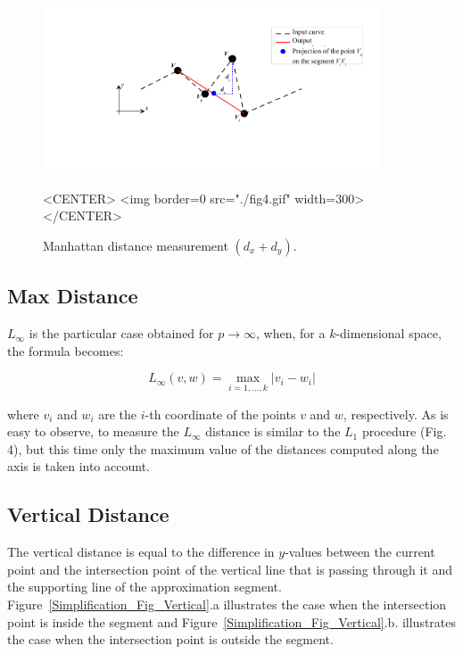 \begin{figure}[h]
\begin{ccTexOnly}
\begin{center}
\includegraphics[width=10cm]{Polygonal_approximation_d/fig4} 
\end{center}
\end{ccTexOnly}
\caption{Manhattan distance measurement $(d_x+d_y)$.
\label{Simplification_Fig_Manhattan}}
\begin{ccHtmlOnly}
<CENTER>
<img border=0 src="./fig4.gif" width=300>
</CENTER>
\end{ccHtmlOnly}
\end{figure}





\subsection{Max Distance}

$L_\infty$ is the particular case obtained for $ p \rightarrow \infty$, when, for a $k$-dimensional space, the formula becomes:

$$ L_\infty (v, w) = \max_{i=1,\ldots,k}{ | v_i - w_i | } $$

where $v_i$ and $w_i$ are the $i$-th coordinate of the points $v$ and $w$, respectively.  
As is easy to observe, to measure the $L_\infty$ distance is similar to the $L_1$ procedure (Fig. 4), 
but this time only the maximum value of the distances computed along the axis is taken into account. 

\subsection{Vertical Distance}

The vertical distance is equal to the difference in $y$-values between
the current point and the intersection point of the vertical line that
is passing through it and the supporting line of the approximation
segment. Figure~\ref{Simplification_Fig_Vertical}.a illustrates the case
when the intersection point is inside the segment and Figure~\ref{Simplification_Fig_Vertical}.b. 
illustrates the case when the intersection point is outside the segment.


